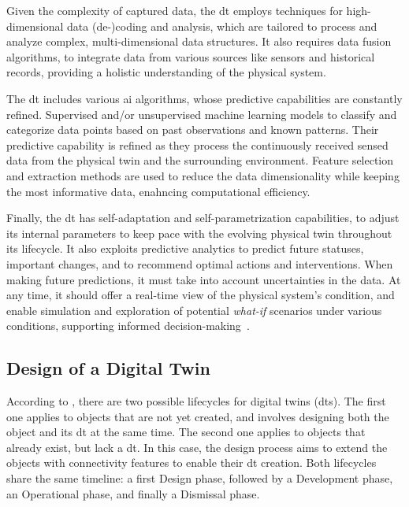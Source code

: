     Given the complexity of captured data, the \acrshort{dt} employs techniques for high-dimensional data (de-)coding and analysis, which are tailored to process and analyze complex, multi-dimensional data structures. It also requires data fusion algorithms, to integrate data from various sources like sensors and historical records, providing a holistic understanding of the physical system.

    The \acrshort{dt} includes various \acrshort{ai} algorithms, whose predictive capabilities are constantly refined. Supervised and/or unsupervised machine learning models to classify and categorize data points based on past observations and known patterns. Their predictive capability is refined as they process the continuously received sensed data from the physical twin and the surrounding environment. Feature selection and extraction methods are used to reduce the data dimensionality while keeping the most informative data, enahncing computational efficiency.

    Finally, the \acrshort{dt} has self-adaptation and self-parametrization capabilities, to adjust its internal parameters to keep pace with the evolving physical twin throughout its lifecycle. It also exploits predictive analytics to predict future statuses, important changes, and to recommend optimal actions and interventions. When making future predictions, it must take into account uncertainties in the data. At any time, it should offer a real-time view of the physical system's condition, and enable simulation and exploration of potential \textit{what-if} scenarios under various conditions, supporting informed decision-making~\parencite{boschertDigitalTwinSimulation2016}.
\fi

\subsection{Design of a Digital Twin}

According to \cite{barricelliSurveyDigitalTwin2019}, there are two possible lifecycles for digital twins (\acrshort{dt}s). The first one applies to objects that are not yet created, and involves designing both the object and its \acrshort{dt} at the same time. The second one applies to objects that already exist, but lack a \acrshort{dt}. In this case, the design process aims to extend the objects with connectivity features to enable their \acrshort{dt} creation. Both lifecycles share the same timeline: a first Design phase, followed by a Development phase, an Operational phase, and finally a Dismissal phase.

